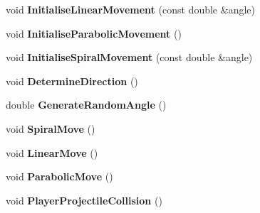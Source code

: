 \begin{DoxyCompactItemize}
void {\bfseries Initialise\+Linear\+Movement} (const double \&angle)
\item 
\mbox{\label{class_enemy_a09e8b7d2eefd3db68de4a32bb7f4e7e5}} 
void {\bfseries Initialise\+Parabolic\+Movement} ()
\item 
\mbox{\label{class_enemy_a8af64f959b402b1d64d218e3be6412ce}} 
void {\bfseries Initialise\+Spiral\+Movement} (const double \&angle)
\item 
\mbox{\label{class_enemy_afcdf2fa6104b3805b0f20ee7ef258f5d}} 
void {\bfseries Determine\+Direction} ()
\item 
\mbox{\label{class_enemy_ad520b2e836c44954584fb2d29eed1c73}} 
double {\bfseries Generate\+Random\+Angle} ()
\item 
\mbox{\label{class_enemy_a29a0efd302ab7be5d40be3efb18dd4ff}} 
void {\bfseries Spiral\+Move} ()
\item 
\mbox{\label{class_enemy_ace66b1e7bd7822bdb5318586ed235332}} 
void {\bfseries Linear\+Move} ()
\item 
\mbox{\label{class_enemy_a6e804d11c9828650329be29063e53050}} 
void {\bfseries Parabolic\+Move} ()
\item 
\mbox{\label{class_enemy_a9c4e7e1c9f79650d1f0dd3c72ae9c82d}} 
void {\bfseries Player\+Projectile\+Collision} ()
\end{DoxyCompactItemize}
